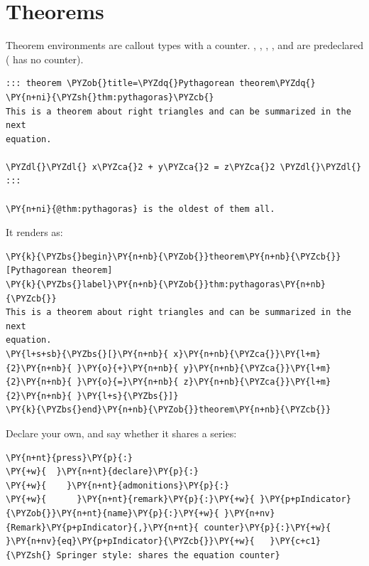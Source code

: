 \documentclass[a4paper,twoside]{article}
\begin{document}
\section{Theorems}
Theorem environments are callout types with a counter. , ,
, ,  and  are predeclared (
has no counter).
\begin{tscode}[lang=md, engine=pygments]
\begin{Verbatim}[commandchars=\\\{\},breaklines, breakanywhere, commandchars=\\\{\}]
::: theorem \PYZob{}title=\PYZdq{}Pythagorean theorem\PYZdq{} \PY{n+ni}{\PYZsh{}thm:pythagoras}\PYZcb{}
This is a theorem about right triangles and can be summarized in the next
equation.

\PYZdl{}\PYZdl{} x\PYZca{}2 + y\PYZca{}2 = z\PYZca{}2 \PYZdl{}\PYZdl{}
:::

\PY{n+ni}{@thm:pythagoras} is the oldest of them all.
\end{Verbatim}
\end{tscode}
It renders as:
\begin{tscode}[lang=latex, engine=pygments]
\begin{Verbatim}[commandchars=\\\{\},breaklines, breakanywhere, commandchars=\\\{\}]
\PY{k}{\PYZbs{}begin}\PY{n+nb}{\PYZob{}}theorem\PY{n+nb}{\PYZcb{}}[Pythagorean theorem]
\PY{k}{\PYZbs{}label}\PY{n+nb}{\PYZob{}}thm:pythagoras\PY{n+nb}{\PYZcb{}}
This is a theorem about right triangles and can be summarized in the next
equation.
\PY{l+s+sb}{\PYZbs{}[}\PY{n+nb}{ x}\PY{n+nb}{\PYZca{}}\PY{l+m}{2}\PY{n+nb}{ }\PY{o}{+}\PY{n+nb}{ y}\PY{n+nb}{\PYZca{}}\PY{l+m}{2}\PY{n+nb}{ }\PY{o}{=}\PY{n+nb}{ z}\PY{n+nb}{\PYZca{}}\PY{l+m}{2}\PY{n+nb}{ }\PY{l+s}{\PYZbs{}]}
\PY{k}{\PYZbs{}end}\PY{n+nb}{\PYZob{}}theorem\PY{n+nb}{\PYZcb{}}
\end{Verbatim}
\end{tscode}
Declare your own, and say whether it shares a series:
\begin{tscode}[lang=yaml, engine=pygments]
\begin{Verbatim}[commandchars=\\\{\},breaklines, breakanywhere, commandchars=\\\{\}]
\PY{n+nt}{press}\PY{p}{:}
\PY{+w}{  }\PY{n+nt}{declare}\PY{p}{:}
\PY{+w}{    }\PY{n+nt}{admonitions}\PY{p}{:}
\PY{+w}{      }\PY{n+nt}{remark}\PY{p}{:}\PY{+w}{ }\PY{p+pIndicator}{\PYZob{}}\PY{n+nt}{name}\PY{p}{:}\PY{+w}{ }\PY{n+nv}{Remark}\PY{p+pIndicator}{,}\PY{n+nt}{ counter}\PY{p}{:}\PY{+w}{ }\PY{n+nv}{eq}\PY{p+pIndicator}{\PYZcb{}}\PY{+w}{   }\PY{c+c1}{\PYZsh{} Springer style: shares the equation counter}
\end{Verbatim}
\end{tscode}
\end{document}
